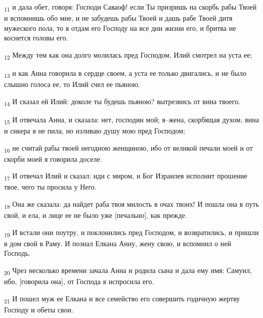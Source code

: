 \begin{tcolorbox}
\textsubscript{11} и дала обет, говоря: Господи Саваоф! если Ты призришь на скорбь рабы Твоей и вспомнишь обо мне, и не забудешь рабы Твоей и дашь рабе Твоей дитя мужеского пола, то я отдам его Господу на все дни жизни его, и бритва не коснется головы его.
\end{tcolorbox}
\begin{tcolorbox}
\textsubscript{12} Между тем как она долго молилась пред Господом, Илий смотрел на уста ее;
\end{tcolorbox}
\begin{tcolorbox}
\textsubscript{13} и как Анна говорила в сердце своем, а уста ее только двигались, и не было слышно голоса ее, то Илий счел ее пьяною.
\end{tcolorbox}
\begin{tcolorbox}
\textsubscript{14} И сказал ей Илий: доколе ты будешь пьяною? вытрезвись от вина твоего.
\end{tcolorbox}
\begin{tcolorbox}
\textsubscript{15} И отвечала Анна, и сказала: нет, господин мой; я--жена, скорбящая духом, вина и сикера я не пила, но изливаю душу мою пред Господом;
\end{tcolorbox}
\begin{tcolorbox}
\textsubscript{16} не считай рабы твоей негодною женщиною, ибо от великой печали моей и от скорби моей я говорила доселе.
\end{tcolorbox}
\begin{tcolorbox}
\textsubscript{17} И отвечал Илий и сказал: иди с миром, и Бог Израилев исполнит прошение твое, чего ты просила у Него.
\end{tcolorbox}
\begin{tcolorbox}
\textsubscript{18} Она же сказала: да найдет раба твоя милость в очах твоих! И пошла она в путь свой, и ела, и лице ее не было уже [печально], как прежде.
\end{tcolorbox}
\begin{tcolorbox}
\textsubscript{19} И встали они поутру, и поклонились пред Господом, и возвратились, и пришли в дом свой в Раму. И познал Елкана Анну, жену свою, и вспомнил о ней Господь.
\end{tcolorbox}
\begin{tcolorbox}
\textsubscript{20} Чрез несколько времени зачала Анна и родила сына и дала ему имя: Самуил, ибо, [говорила она], от Господа я испросила его.
\end{tcolorbox}
\begin{tcolorbox}
\textsubscript{21} И пошел муж ее Елкана и все семейство его совершить годичную жертву Господу и обеты свои.
\end{tcolorbox}
